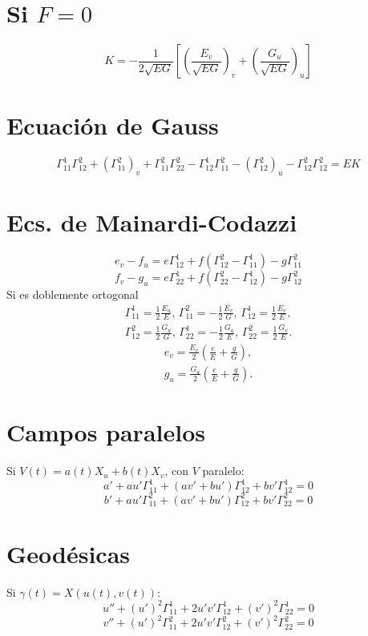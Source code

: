 \documentclass[8pt]{article}
\begin{document}
\begin{multicols}{3}
\section*{Si $F = 0$}
\[
K = -\frac{1}{2\sqrt{EG}} \left[
\left( \frac{E_v}{\sqrt{EG}} \right)_v +
\left( \frac{G_u}{\sqrt{EG}} \right)_u
\right]
\]

\section*{Ecuación de Gauss}
\[
\Gamma^1_{11} \Gamma^2_{12} + (\Gamma^2_{11})_v + \Gamma^2_{11} \Gamma^2_{22}
- \Gamma^1_{12} \Gamma^2_{11} - (\Gamma^2_{12})_u - \Gamma^2_{12} \Gamma^2_{12}
= EK
\]

\section*{Ecs. de Mainardi-Codazzi}
\[
e_v - f_u = e\Gamma^1_{12} + f(\Gamma^2_{12} - \Gamma^1_{11}) - g\Gamma^2_{11}
\]
\[
f_v - g_u = e\Gamma^1_{22} + f(\Gamma^2_{22} - \Gamma^1_{12}) - g\Gamma^2_{12}
\]
Si es doblemente ortogonal
\begin{align*}
  \Gamma_{11}^{1}=\frac{1}{2}\frac{E_{u}}{E},  \, \Gamma_{11}^{2}=-\frac{1}{2}\frac{E_{v}}{G}, \,\Gamma_{12}^{1}=\frac{1}{2}\frac{E_{v}}{E},\\
  \Gamma_{12}^{2}=\frac{1}{2}\frac{G_{u}}{G}, \, \Gamma_{22}^{1}=-\frac{1}{2}\frac{G_u}{E}, \, \Gamma_{22}^{2}=\frac{1}{2}\frac{G_{v}}{E}.
\end{align*}
\begin{align*}
  e_{v}=\frac{E_{v}}{2}\left( \frac{e}{E}+\frac{g}{G} \right),\\
  g_{u}=\frac{G_{u}}{2}\left( \frac{e}{E}+\frac{g}{G} \right).
\end{align*}
\section*{Campos paralelos}
Si $V(t) = a(t)X_u + b(t)X_v$, con $V$ paralelo:
\[
a' + a u' \Gamma^1_{11} + (a v' + b u') \Gamma^1_{12} + b v' \Gamma^1_{12} = 0
\]
\[
b' + a u' \Gamma^2_{11} + (a v' + b u') \Gamma^2_{12} + b v' \Gamma^2_{22} = 0
\]

\section*{Geodésicas}
Si $\gamma(t) = X(u(t), v(t))$:
\[
u'' + (u')^2 \Gamma^1_{11} + 2u'v'\Gamma^1_{12} + (v')^2\Gamma^1_{22} = 0
\]
\[
v'' + (u')^2 \Gamma^2_{11} + 2u'v'\Gamma^2_{12} + (v')^2\Gamma^2_{22} = 0
\]


\end{multicols}
\end{document}
